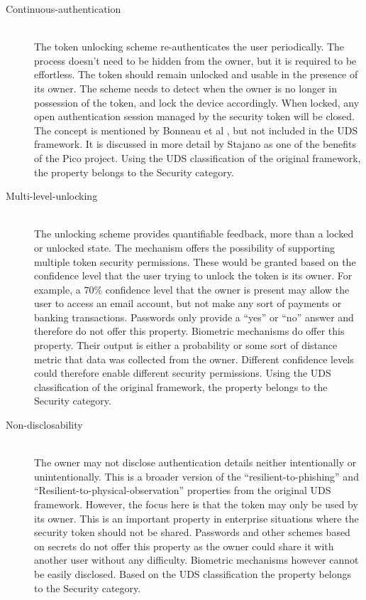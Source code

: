 \begin{description}
  \item[Continuous-authentication] \hfill \\
  The token unlocking scheme re-authenticates the user periodically. The process doesn't need to be hidden from the owner, but it is required to be effortless. The token should remain unlocked and usable in the presence of its owner. The scheme needs to detect when the owner is no longer in possession of the token, and lock the device accordingly. When locked, any open authentication session managed by the security token will be closed. The concept is mentioned by Bonneau et al \cite{bonneau2012quest}, but not included in the UDS framework. It is discussed in more detail by Stajano \cite{stajano2011pico} as one of the benefits of the Pico project. Using the UDS classification of the original framework, the property belongs to the Security category.
  
  \item[Multi-level-unlocking] \hfill \\
  The unlocking scheme provides quantifiable feedback, more than a locked or unlocked state. The mechanism offers the possibility of supporting multiple token security permissions. These would be granted based on the confidence level that the user trying to unlock the token is its owner. For example, a $70\%$ confidence level that the owner is present may allow the user to access an email account, but not make any sort of payments or banking transactions. Passwords only provide a ``yes'' or ``no'' answer and therefore do not offer this property. Biometric mechanisms do offer this property. Their output is either a probability or some sort of distance metric that data was collected from the owner. Different confidence levels could therefore enable different security permissions. Using the UDS classification of the original framework, the property belongs to the Security category.
  
  \item[Non-disclosability] \hfill \\
  The owner may not disclose authentication details neither intentionally or unintentionally. This is a broader version of the ``resilient-to-phishing'' and ``Resilient-to-physical-observation'' properties from the original UDS framework. However, the focus here is that the token may only be used by its owner. This is an important property in enterprise situations where the security token should not be shared. Passwords and other schemes based on secrets do not offer this property as the owner could share it with another user without any difficulty. Biometric mechanisms however cannot be easily disclosed. Based on the UDS classification the property belongs to the Security category.
  

\end{description}
